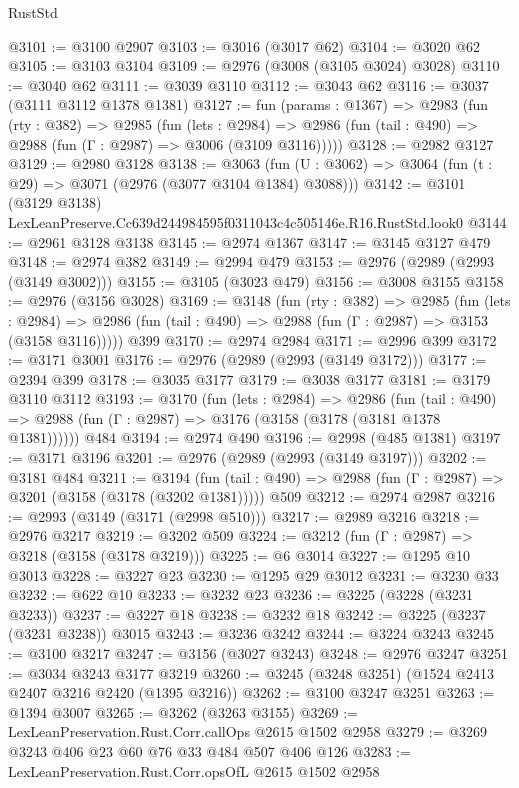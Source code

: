 \begin{lexlean}{RustStd}
\begin{coremodule}
@3101 := @3100 @2907
@3103 := @3016 (@3017 @62)
@3104 := @3020 @62
@3105 := @3103 @3104
@3109 := @2976 (@3008 (@3105 @3024) @3028)
@3110 := @3040 @62
@3111 := @3039 @3110
@3112 := @3043 @62
@3116 := @3037 (@3111 @3112 @1378 @1381)
@3127 := fun (params : @1367) =>
  @2983
    (fun (rty : @382) =>
    @2985
      (fun (lets : @2984) =>
      @2986 (fun (tail : @490) => @2988 (fun (Γ : @2987) => @3006 (@3109 @3116)))))
@3128 := @2982 @3127
@3129 := @2980 @3128
@3138 := @3063 (fun (U : @3062) => @3064 (fun (t : @29) => @3071 (@2976 (@3077 @3104 @1384) @3088)))
@3142 := @3101 (@3129 @3138) LexLeanPreserve.Cc639d244984595f0311043c4c505146e.R16.RustStd.look0
@3144 := @2961 @3128 @3138
@3145 := @2974 @1367
@3147 := @3145 @3127 @479
@3148 := @2974 @382
@3149 := @2994 @479
@3153 := @2976 (@2989 (@2993 (@3149 @3002)))
@3155 := @3105 (@3023 @479)
@3156 := @3008 @3155
@3158 := @2976 (@3156 @3028)
@3169 := @3148
    (fun (rty : @382) =>
    @2985
      (fun (lets : @2984) =>
      @2986 (fun (tail : @490) => @2988 (fun (Γ : @2987) => @3153 (@3158 @3116)))))
    @399
@3170 := @2974 @2984
@3171 := @2996 @399
@3172 := @3171 @3001
@3176 := @2976 (@2989 (@2993 (@3149 @3172)))
@3177 := @2394 @399
@3178 := @3035 @3177
@3179 := @3038 @3177
@3181 := @3179 @3110 @3112
@3193 := @3170
    (fun (lets : @2984) =>
    @2986
      (fun (tail : @490) => @2988 (fun (Γ : @2987) => @3176 (@3158 (@3178 (@3181 @1378 @1381))))))
    @484
@3194 := @2974 @490
@3196 := @2998 (@485 @1381)
@3197 := @3171 @3196
@3201 := @2976 (@2989 (@2993 (@3149 @3197)))
@3202 := @3181 @484
@3211 := @3194
    (fun (tail : @490) => @2988 (fun (Γ : @2987) => @3201 (@3158 (@3178 (@3202 @1381)))))
    @509
@3212 := @2974 @2987
@3216 := @2993 (@3149 (@3171 (@2998 @510)))
@3217 := @2989 @3216
@3218 := @2976 @3217
@3219 := @3202 @509
@3224 := @3212 (fun (Γ : @2987) => @3218 (@3158 (@3178 @3219)))
@3225 := @6 @3014
@3227 := @1295 @10 @3013
@3228 := @3227 @23
@3230 := @1295 @29 @3012
@3231 := @3230 @33
@3232 := @622 @10
@3233 := @3232 @23
@3236 := @3225 (@3228 (@3231 @3233))
@3237 := @3227 @18
@3238 := @3232 @18
@3242 := @3225 (@3237 (@3231 @3238)) @3015
@3243 := @3236 @3242
@3244 := @3224 @3243
@3245 := @3100 @3217
@3247 := @3156 (@3027 @3243)
@3248 := @2976 @3247
@3251 := @3034 @3243 @3177 @3219
@3260 := @3245 (@3248 @3251) (@1524 @2413 @2407 @3216 @2420 (@1395 @3216))
@3262 := @3100 @3247 @3251
@3263 := @1394 @3007
@3265 := @3262 (@3263 @3155)
@3269 := LexLeanPreservation.Rust.Corr.callOps @2615 @1502 @2958
@3279 := @3269 @3243 @406 @23 @60 @76 @33 @484 @507 @406 @126
@3283 := LexLeanPreservation.Rust.Corr.opsOfL @2615 @1502 @2958

\end{coremodule}
\end{lexlean}
